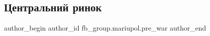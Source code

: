  
 
 
 
 

\subsection{Центральний ринок}
\label{sec:18_02_2023.fb.fb_group.mariupol.pre_war.1.tsentralnii_rinok}

\ifcmt
 author_begin
   author_id fb_group.mariupol.pre_war
 author_end
\fi
